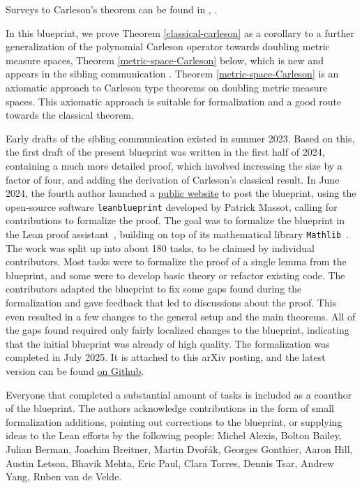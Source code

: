 Surveys to Carleson's theorem can be found in \cite{MR2091007}, \cite{MR3334208}.

In this blueprint, we prove Theorem \ref{classical-carleson} as a corollary to a further generalization of the polynomial Carleson operator towards doubling metric measure spaces,
Theorem \ref{metric-space-Carleson} below,
which is new and appears in the sibling communication \cite{becker2024carlesonoperatorsdoublingmetric}.
Theorem \ref{metric-space-Carleson} is an axiomatic approach to
Carleson type theorems on doubling metric measure spaces.
This axiomatic approach is suitable for formalization and a good route towards the classical theorem.

Early drafts of the sibling communication \cite{becker2024carlesonoperatorsdoublingmetric} existed in summer 2023.
Based on this, the first draft of the present blueprint was written in the first half of 2024,
containing a much more detailed proof, which involved increasing the size by a factor of four,
and adding the derivation of Carleson's classical result.
In June 2024, the fourth author launched a \href{https://florisvandoorn.com/carleson/}{public website}
to post the blueprint, using the open-source software \texttt{leanblueprint} developed by Patrick Massot,
calling for contributions to formalize the proof.
The goal was to formalize the blueprint in the Lean proof assistant~\cite{moura2021lean},
building on top of its mathematical library \texttt{Mathlib}~\cite{mathlib}.
The work was split up into about 180 tasks, to be claimed by individual contributors.
Most tasks were to formalize the proof of a single lemma from the blueprint, and some were to develop basic theory or refactor existing code.
The contributors adapted the blueprint to fix some gaps found during the formalization and gave feedback that led to discussions about the proof.
This even resulted in a few changes to the general setup and the main theorems.
All of the gaps found required only fairly localized changes to the blueprint, indicating that the initial blueprint was already of high quality.
The formalization was completed in July 2025. It is attached to this arXiv posting, and the latest version can be found \href{https://github.com/fpvandoorn/carleson}{on Github}.

Everyone that completed a substantial amount of tasks is included as a coauthor of the blueprint.
The authors acknowledge contributions in the form of small formalization additions,
pointing out corrections to the blueprint,
or supplying ideas to the Lean efforts by the following people:
Michel Alexis,
Bolton Bailey,
Julian Berman,
Joachim Breitner,
Martin Dvoř\'ak,
Georges Gonthier,
Aaron Hill,
Austin Letson,
Bhavik Mehta,
Eric Paul,
Clara Torres,
Dennis Tsar,
Andrew Yang,
Ruben van de Velde.

